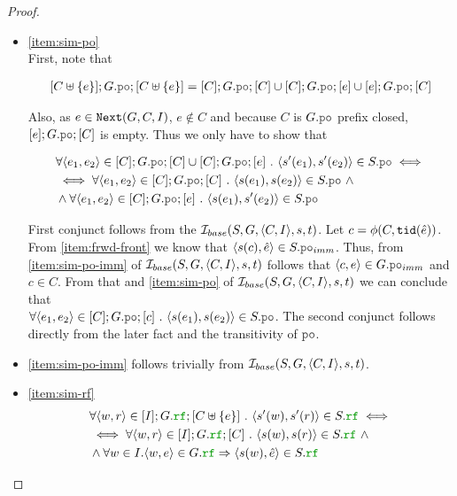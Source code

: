 \documentclass[12pt]{article}
\begin{document}
\begin{proof}
\begin{itemize}
  \item \ref{item:sim-po} \\
    First, note that 
    
    \begin{equation*}
      \begin{split}
        [C \uplus \{e\}];G.\lPO;[C \uplus \{e\}] =
          [C];G.\lPO;[C] \cup [C];G.\lPO;[e] \cup [e];G.\lPO;[C]
      \end{split}
    \end{equation*}

    Also, as $e \in {\mathtt{Next}}(G, C, I)$, $e \not\in C$ and
    because $C$ is $G.\lPO$ prefix closed, $[e];G.\lPO;[C]$ is empty.
    Thus we only have to show that

    \begin{equation*}
      \begin{split}
        & \forall{\tup{e_1, e_2} \in [C];G.\lPO;[C] \cup [C];G.\lPO;[e]} ~.~
            \tup{s'(e_1), s'(e_2)} \in S.\lPO \iff \\
        & \iff
          \forall{\tup{e_1, e_2} \in [C];G.\lPO;[C]} ~.~ \tup{s(e_1), s(e_2)} \in S.\lPO ~ \wedge \\
        & \wedge
          \forall{\tup{e_1, e_2} \in [C];G.\lPO;[e]} ~.~ \tup{s(e_1), s'(e_2)} \in S.\lPO
      \end{split}
    \end{equation*}

    First conjunct follows from the $\mathcal{I}_{base}(S, G, \langle C, I \rangle, s, t)$.
    Let $c = \phi(C, {\mathtt{tid}}(\hat{e}))$. 
    From \ref{item:frwd-front} we know that $\tup{s(c), \hat{e}} \in S.\lPO_{imm}$.
    Thus, from \ref{item:sim-po-imm} of $\mathcal{I}_{base}(S, G, \langle C, I \rangle, s, t)$
    follows that $\tup{c, e} \in G.\lPO_{imm}$ and $c \in C$.
    From that and \ref{item:sim-po} of $\mathcal{I}_{base}(S, G, \langle C, I \rangle, s, t)$
    we can conclude that \\
    $\forall{\tup{e_1, e_2} \in [C];G.\lPO;[c]} ~.~ \tup{s(e_1), s(e_2)} \in S.\lPO$.
    The second conjunct follows directly from the later fact and the transitivity of $\lPO$.

  \item \ref{item:sim-po-imm} follows trivially from $\mathcal{I}_{base}(S, G, \langle C, I \rangle, s, t)$.
    
  \item \ref{item:sim-rf} \\
    
    \begin{equation*}
      \begin{split}
        & \forall{\tup{w, r} \in [I];G.\lRF;[C \uplus \{e\}]} ~.~
          \tup{s'(w), s'(r)} \in S.\lRF \iff \\
        & \iff \forall{\tup{w, r} \in [I];G.\lRF;[C]} ~.~ \tup{s(w), s(r)} \in S.\lRF ~ \wedge \\
        & \wedge \forall{w \in I}. \tup{w, e} \in G.\lRF \Rightarrow \tup{s(w), \hat{e}} \in S.\lRF
      \end{split}
    \end{equation*}


\end{itemize}
\end{proof}
\end{document}
